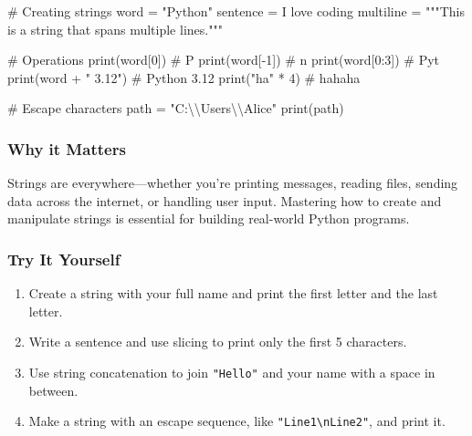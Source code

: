 \documentclass[
  letterpaper,
  DIV=11,
  numbers=noendperiod]{scrreprt}
\newenvironment{Shaded}{\begin{snugshade}}{\end{snugshade}}
\newcommand{\BuiltInTok}[1]{\textcolor[rgb]{0.00,0.23,0.31}{#1}}
\newcommand{\CharTok}[1]{\textcolor[rgb]{0.13,0.47,0.30}{#1}}
\newcommand{\CommentTok}[1]{\textcolor[rgb]{0.37,0.37,0.37}{#1}}
\newcommand{\DecValTok}[1]{\textcolor[rgb]{0.68,0.00,0.00}{#1}}
\newcommand{\NormalTok}[1]{\textcolor[rgb]{0.00,0.23,0.31}{#1}}
\newcommand{\OperatorTok}[1]{\textcolor[rgb]{0.37,0.37,0.37}{#1}}
\newcommand{\StringTok}[1]{\textcolor[rgb]{0.13,0.47,0.30}{#1}}
\providecommand{\tightlist}{%
  \setlength{\itemsep}{0pt}\setlength{\parskip}{0pt}}
\begin{document}
\begin{Shaded}
\begin{Highlighting}[]
\CommentTok{\# Creating strings}
\NormalTok{word }\OperatorTok{=} \StringTok{"Python"}
\NormalTok{sentence }\OperatorTok{=} \StringTok{\textquotesingle{}I love coding\textquotesingle{}}
\NormalTok{multiline }\OperatorTok{=} \StringTok{"""This is}
\StringTok{a string that spans}
\StringTok{multiple lines."""}

\CommentTok{\# Operations}
\BuiltInTok{print}\NormalTok{(word[}\DecValTok{0}\NormalTok{])        }\CommentTok{\# \textquotesingle{}P\textquotesingle{}}
\BuiltInTok{print}\NormalTok{(word[}\OperatorTok{{-}}\DecValTok{1}\NormalTok{])       }\CommentTok{\# \textquotesingle{}n\textquotesingle{}}
\BuiltInTok{print}\NormalTok{(word[}\DecValTok{0}\NormalTok{:}\DecValTok{3}\NormalTok{])      }\CommentTok{\# \textquotesingle{}Pyt\textquotesingle{}}
\BuiltInTok{print}\NormalTok{(word }\OperatorTok{+} \StringTok{" 3.12"}\NormalTok{) }\CommentTok{\# \textquotesingle{}Python 3.12\textquotesingle{}}
\BuiltInTok{print}\NormalTok{(}\StringTok{"ha"} \OperatorTok{*} \DecValTok{4}\NormalTok{)       }\CommentTok{\# \textquotesingle{}hahaha\textquotesingle{}}

\CommentTok{\# Escape characters}
\NormalTok{path }\OperatorTok{=} \StringTok{"C:}\CharTok{\textbackslash{}\textbackslash{}}\StringTok{Users}\CharTok{\textbackslash{}\textbackslash{}}\StringTok{Alice"}
\BuiltInTok{print}\NormalTok{(path)}
\end{Highlighting}
\end{Shaded}

\subsubsection{Why it Matters}\label{why-it-matters-7}

Strings are everywhere---whether you're printing messages, reading
files, sending data across the internet, or handling user input.
Mastering how to create and manipulate strings is essential for building
real-world Python programs.

\subsubsection{Try It Yourself}\label{try-it-yourself-7}

\begin{enumerate}
\def\labelenumi{\arabic{enumi}.}
\tightlist
\item
  Create a string with your full name and print the first letter and the
  last letter.
\item
  Write a sentence and use slicing to print only the first 5 characters.
\item
  Use string concatenation to join \texttt{"Hello"} and your name with a
  space in between.
\item
  Make a string with an escape sequence, like
  \texttt{"Line1\textbackslash{}nLine2"}, and print it.
\end{enumerate}
\end{document}
